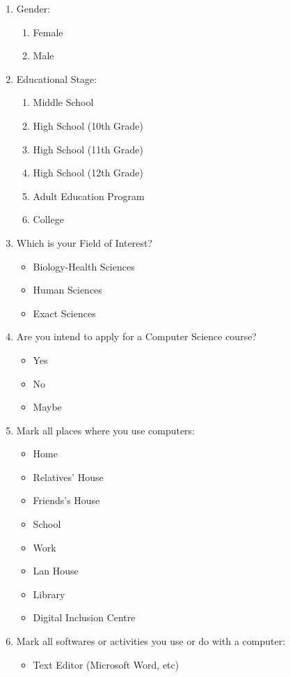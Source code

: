 \begin{enumerate}
	\item Gender:
		\begin{enumerate}
			\item Female
			\item Male
		\end{enumerate}
	\item Educational Stage:
		\begin{enumerate}
			\item Middle School
			\item High School (10th Grade)
			\item High School (11th Grade)
			\item High School (12th Grade)	
			\item Adult Education Program
			\item College		
		\end{enumerate}
	\item Which is your Field of Interest?
		\begin{itemize}
			\item Biology-Health Sciences 
			\item Human Sciences
			\item Exact Sciences	
		\end{itemize}
	\item Are you intend to apply for a Computer Science course?
		\begin{itemize}
			\item Yes
			\item No
			\item Maybe
		\end{itemize}
	\item Mark all places where you use computers:
		\begin{itemize}
			\item Home
			\item Relatives' House
			\item Friends's House
			\item School
			\item Work
			\item Lan House
			\item Library
			\item Digital Inclusion Centre
		\end{itemize}
	\item Mark all softwares or activities you use or do with  a computer:
		\begin{itemize}
			\item Text Editor (Microsoft Word, etc)

\end{itemize}
\end{enumerate}
